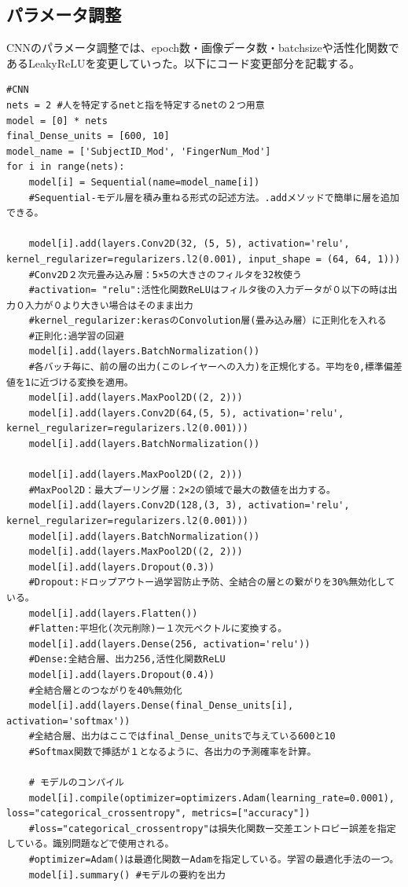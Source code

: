 \documentclass[a4paper, 11pt, titlepage]{jsarticle}
\begin{document}
\subsection{パラメータ調整}
CNNのパラメータ調整では、epoch数・画像データ数・batchsizeや活性化関数であるLeakyReLUを変更していった。以下にコード変更部分を記載する。
\begin{lstlisting}[caption=パラメーター調整code1, label=parameter1]
#CNN
nets = 2 #人を特定するnetと指を特定するnetの２つ用意
model = [0] * nets
final_Dense_units = [600, 10]
model_name = ['SubjectID_Mod', 'FingerNum_Mod']
for i in range(nets):
    model[i] = Sequential(name=model_name[i])
    #Sequential-モデル層を積み重ねる形式の記述方法。.addメソッドで簡単に層を追加できる。

    model[i].add(layers.Conv2D(32, (5, 5), activation='relu', kernel_regularizer=regularizers.l2(0.001), input_shape = (64, 64, 1)))
    #Conv2D２次元畳み込み層：5×5の大きさのフィルタを32枚使う
    #activation= "relu":活性化関数ReLUはフィルタ後の入力データが０以下の時は出力０入力が０より大きい場合はそのまま出力
    #kernel_regularizer:kerasのConvolution層(畳み込み層）に正則化を入れる
    #正則化:過学習の回避
    model[i].add(layers.BatchNormalization())
    #各バッチ毎に、前の層の出力(このレイヤーへの入力)を正規化する。平均を0,標準偏差値を1に近づける変換を適用。
    model[i].add(layers.MaxPool2D((2, 2)))
    model[i].add(layers.Conv2D(64,(5, 5), activation='relu', kernel_regularizer=regularizers.l2(0.001)))
    model[i].add(layers.BatchNormalization())
    
    model[i].add(layers.MaxPool2D((2, 2)))
    #MaxPool2D：最大プーリング層：2×2の領域で最大の数値を出力する。
    model[i].add(layers.Conv2D(128,(3, 3), activation='relu', kernel_regularizer=regularizers.l2(0.001)))
    model[i].add(layers.BatchNormalization())
    model[i].add(layers.MaxPool2D((2, 2)))
    model[i].add(layers.Dropout(0.3))
    #Dropout:ドロップアウトー過学習防止予防、全結合の層との繋がりを30%無効化している。
    model[i].add(layers.Flatten())
    #Flatten:平坦化(次元削除)ー１次元ベクトルに変換する。
    model[i].add(layers.Dense(256, activation='relu'))
    #Dense:全結合層、出力256,活性化関数ReLU
    model[i].add(layers.Dropout(0.4))
    #全結合層とのつながりを40%無効化
    model[i].add(layers.Dense(final_Dense_units[i], activation='softmax'))
    #全結合層、出力はここではfinal_Dense_unitsで与えている600と10
    #Softmax関数で挿話が１となるように、各出力の予測確率を計算。

    # モデルのコンパイル
    model[i].compile(optimizer=optimizers.Adam(learning_rate=0.0001), loss="categorical_crossentropy", metrics=["accuracy"])
    #loss="categorical_crossentropy"は損失化関数ー交差エントロピー誤差を指定している。識別問題などで使用される。
    #optimizer=Adam()は最適化関数ーAdamを指定している。学習の最適化手法の一つ。
    model[i].summary() #モデルの要約を出力
\end{lstlisting}
\end{document}
